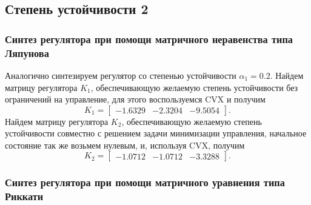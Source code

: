 \subsection{Степень устойчивости 2}

\subsubsection{Синтез регулятора при помощи матричного неравенства
типа Ляпунова}

Аналогично синтезируем регулятор со степенью устойчивости $\alpha_1=0.2$.
Найдем матрицу регулятора $K_1$, обеспечивающую желаемую степень 
устойчивости без ограничений на управление, для этого воспользуемся CVX и получим
\begin{equation*}
    K_1=\begin{bmatrix}
        -1.6329&	-2.3204&	-9.5054
    \end{bmatrix}.
\end{equation*}
Найдем матрицу регулятора $K_2$, обеспечивающую желаемую степень 
устойчивости совместно с решением задачи минимизации управления,
начальное состояние так же возьмем нулевым, и, используя CVX, получим
\begin{equation*}
    K_2=\begin{bmatrix}
        -1.0712&	-1.0712&	-3.3288
    \end{bmatrix}.
\end{equation*}


\subsubsection{Синтез регулятора при помощи матричного
уравнения типа Риккати}


